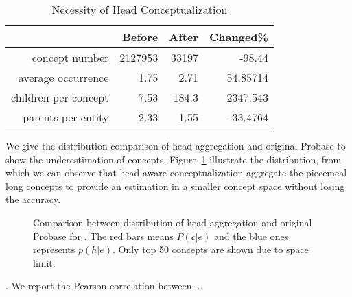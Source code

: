 \begin{table}[htbp]
  \centering
  \caption{Necessity of Head Conceptualization}
    \begin{tabular}{rrrr}
    \toprule
          & Before & After & Changed\% \\
    \midrule
    concept number & 2127953 & 33197 & -98.44 \\
    average occurrence & 1.75  & 2.71  & 54.85714 \\
    children per concept & 7.53  & 184.3 & 2347.543 \\
    parents per entity & 2.33  & 1.55  & -33.4764 \\
    \bottomrule
    \end{tabular}%
  \label{tab:nhc}%
\end{table}%


We give the distribution comparison of head aggregation and original Probase to show the underestimation of concepts.
Figure~\ref{fig:hac} illustrate the distribution, from which we can observe that head-aware conceptualization aggregate the piecemeal long concepts to provide an estimation in a smaller concept space without losing the accuracy.


\begin{figure}[!htb]
\centering
{}
\caption{Comparison between distribution of head aggregation and original Probase for . \small The red bars means $P(c|e)$ and the blue ones represents $p(h|e)$. Only top 50 concepts are shown due to space limit.  }
\label{fig:hac}
\end{figure}


. We report the Pearson correlation between....

